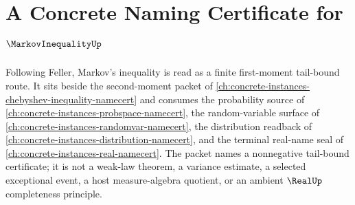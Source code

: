 \chapter{A Concrete Naming Certificate for $\MarkovInequalityUp$}
\label{ch:concrete-instances-markov-inequality-namecert}

Following Feller, Markov's inequality is read as a finite first-moment tail-bound route. It sits beside the second-moment packet of \autoref{ch:concrete-instances-chebyshev-inequality-namecert} and consumes the probability source of \autoref{ch:concrete-instances-probspace-namecert}, the random-variable surface of \autoref{ch:concrete-instances-randomvar-namecert}, the distribution readback of \autoref{ch:concrete-instances-distribution-namecert}, and the terminal real-name seal of \autoref{ch:concrete-instances-real-namecert}. The packet names a nonnegative tail-bound certificate; it is not a weak-law theorem, a variance estimate, a selected exceptional event, a host measure-algebra quotient, or an ambient $\RealUp$ completeness principle.

